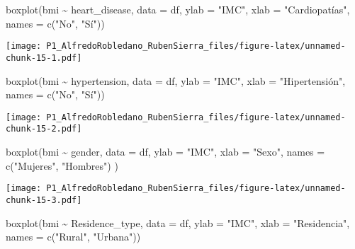 \documentclass[
]{article}
\newenvironment{Shaded}{\begin{snugshade}}{\end{snugshade}}
\newcommand{\AttributeTok}[1]{\textcolor[rgb]{0.77,0.63,0.00}{#1}}
\newcommand{\FunctionTok}[1]{\textcolor[rgb]{0.00,0.00,0.00}{#1}}
\newcommand{\NormalTok}[1]{#1}
\newcommand{\SpecialCharTok}[1]{\textcolor[rgb]{0.00,0.00,0.00}{#1}}
\newcommand{\StringTok}[1]{\textcolor[rgb]{0.31,0.60,0.02}{#1}}
\begin{document}
\begin{Shaded}
\begin{Highlighting}[]
\FunctionTok{boxplot}\NormalTok{(bmi }\SpecialCharTok{\textasciitilde{}}\NormalTok{ heart\_disease, }\AttributeTok{data =}\NormalTok{ df, }\AttributeTok{ylab =} \StringTok{"IMC"}\NormalTok{, }\AttributeTok{xlab =} \StringTok{"Cardiopatías"}\NormalTok{, }\AttributeTok{names =} \FunctionTok{c}\NormalTok{(}\StringTok{"No"}\NormalTok{, }\StringTok{"Sí"}\NormalTok{))}
\end{Highlighting}
\end{Shaded}

\texttt{[image: P1\_AlfredoRobledano\_RubenSierra\_files/figure-latex/unnamed-chunk-15-1.pdf]}

\begin{Shaded}
\begin{Highlighting}[]
\FunctionTok{boxplot}\NormalTok{(bmi }\SpecialCharTok{\textasciitilde{}}\NormalTok{ hypertension, }\AttributeTok{data =}\NormalTok{ df, }\AttributeTok{ylab =} \StringTok{"IMC"}\NormalTok{, }\AttributeTok{xlab =} \StringTok{"Hipertensión"}\NormalTok{, }\AttributeTok{names =} \FunctionTok{c}\NormalTok{(}\StringTok{"No"}\NormalTok{, }\StringTok{"Sí"}\NormalTok{))}
\end{Highlighting}
\end{Shaded}

\texttt{[image: P1\_AlfredoRobledano\_RubenSierra\_files/figure-latex/unnamed-chunk-15-2.pdf]}

\begin{Shaded}
\begin{Highlighting}[]
\FunctionTok{boxplot}\NormalTok{(bmi  }\SpecialCharTok{\textasciitilde{}}\NormalTok{  gender, }\AttributeTok{data =}\NormalTok{ df, }\AttributeTok{ylab =} \StringTok{"IMC"}\NormalTok{, }\AttributeTok{xlab =} \StringTok{"Sexo"}\NormalTok{, }\AttributeTok{names =} \FunctionTok{c}\NormalTok{(}\StringTok{"Mujeres"}\NormalTok{, }\StringTok{"Hombres"}\NormalTok{) )}
\end{Highlighting}
\end{Shaded}

\texttt{[image: P1\_AlfredoRobledano\_RubenSierra\_files/figure-latex/unnamed-chunk-15-3.pdf]}

\begin{Shaded}
\begin{Highlighting}[]
\FunctionTok{boxplot}\NormalTok{(bmi  }\SpecialCharTok{\textasciitilde{}}\NormalTok{  Residence\_type, }\AttributeTok{data =}\NormalTok{ df, }\AttributeTok{ylab =} \StringTok{"IMC"}\NormalTok{, }\AttributeTok{xlab =} \StringTok{"Residencia"}\NormalTok{, }\AttributeTok{names =} \FunctionTok{c}\NormalTok{(}\StringTok{"Rural"}\NormalTok{, }\StringTok{"Urbana"}\NormalTok{))}
\end{Highlighting}
\end{Shaded}
\end{document}
